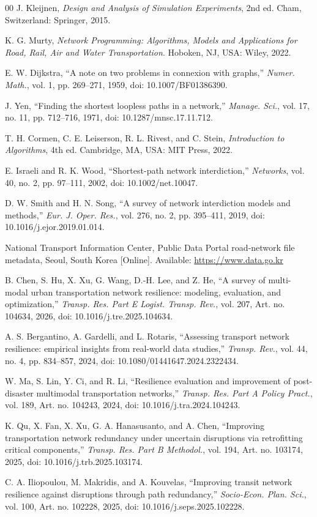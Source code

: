 \documentclass{ieeeaccess}
\begin{document}
\begin{thebibliography}{00}
 J. Kleijnen, \emph{Design and Analysis of Simulation Experiments}, 2nd ed. Cham, Switzerland: Springer, 2015.

 K. G. Murty, \emph{Network Programming: Algorithms, Models and Applications for Road, Rail, Air and Water Transportation}. Hoboken, NJ, USA: Wiley, 2022.

 E. W. Dijkstra, ``A note on two problems in connexion with graphs,'' \emph{Numer. Math.}, vol. 1, pp. 269--271, 1959, doi: 10.1007/BF01386390.

 J. Yen, ``Finding the shortest loopless paths in a network,'' \emph{Manage. Sci.}, vol. 17, no. 11, pp. 712--716, 1971, doi: 10.1287/mnsc.17.11.712.

 T. H. Cormen, C. E. Leiserson, R. L. Rivest, and C. Stein, \emph{Introduction to Algorithms}, 4th ed. Cambridge, MA, USA: MIT Press, 2022.

 E. Israeli and R. K. Wood, ``Shortest-path network interdiction,'' \emph{Networks}, vol. 40, no. 2, pp. 97--111, 2002, doi: 10.1002/net.10047.

 D. W. Smith and H. N. Song, ``A survey of network interdiction models and methods,'' \emph{Eur. J. Oper. Res.}, vol. 276, no. 2, pp. 395--411, 2019, doi: 10.1016/j.ejor.2019.01.014.

 National Transport Information Center, Public Data Portal road-network file metadata, Seoul, South Korea [Online]. Available: \underline{https://www.data.go.kr}

 B. Chen, S. Hu, X. Xu, G. Wang, D.-H. Lee, and Z. He, ``A survey of multi-modal urban transportation network resilience: modeling, evaluation, and optimization,'' \emph{Transp. Res. Part E Logist. Transp. Rev.}, vol. 207, Art. no. 104634, 2026, doi: 10.1016/j.tre.2025.104634.

 A. S. Bergantino, A. Gardelli, and L. Rotaris, ``Assessing transport network resilience: empirical insights from real-world data studies,'' \emph{Transp. Rev.}, vol. 44, no. 4, pp. 834--857, 2024, doi: 10.1080/01441647.2024.2322434.

 W. Ma, S. Lin, Y. Ci, and R. Li, ``Resilience evaluation and improvement of post-disaster multimodal transportation networks,'' \emph{Transp. Res. Part A Policy Pract.}, vol. 189, Art. no. 104243, 2024, doi: 10.1016/j.tra.2024.104243.

 K. Qu, X. Fan, X. Xu, G. A. Hanasusanto, and A. Chen, ``Improving transportation network redundancy under uncertain disruptions via retrofitting critical components,'' \emph{Transp. Res. Part B Methodol.}, vol. 194, Art. no. 103174, 2025, doi: 10.1016/j.trb.2025.103174.

 C. A. Iliopoulou, M. Makridis, and A. Kouvelas, ``Improving transit network resilience against disruptions through path redundancy,'' \emph{Socio-Econ. Plan. Sci.}, vol. 100, Art. no. 102228, 2025, doi: 10.1016/j.seps.2025.102228.

\end{thebibliography}
\end{document}
